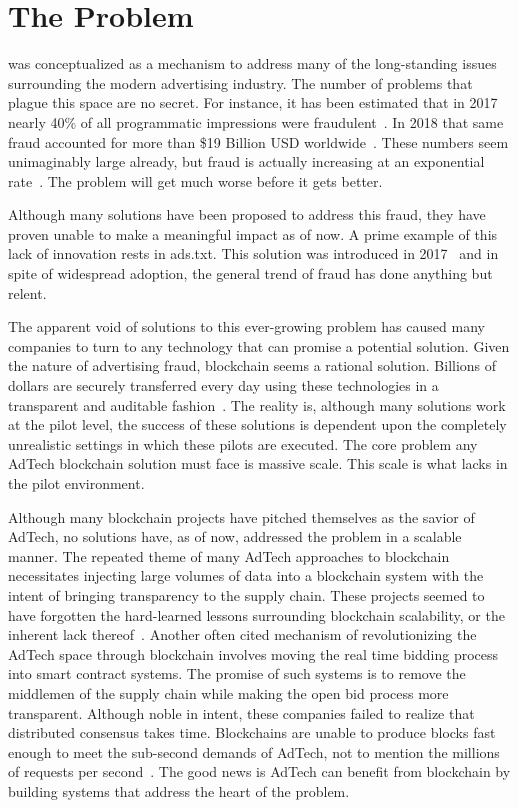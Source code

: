 \section{The Problem}
\LayerTwoLong{} was conceptualized as a mechanism to address many of the
long-standing issues surrounding the modern advertising industry.
The number of problems that plague this space are no secret.
For instance, it has been estimated that in 2017 nearly 40\%  of all
programmatic impressions were fraudulent~\cite{DigitalAdFraud2018}.
In 2018 that same fraud accounted for more than \$19 Billion USD
worldwide~\cite{DigitalAdFraud2018}.
These numbers seem unimaginably large already, but fraud is actually
increasing at an exponential rate~\cite{DigitalAdFraud2018}.
The problem will get much worse before it gets better.

Although many solutions have been proposed to address this fraud, they
have proven unable to make a meaningful impact as of now.
A prime example of this lack of innovation rests in ads.txt.
This solution was introduced in 2017~\cite{IABAdsTxt}
and in spite of widespread adoption, the general trend of
fraud has done anything but relent.

The apparent void of solutions to this ever-growing problem has caused
many companies to turn to any technology that can promise a potential solution.
Given the nature of advertising fraud, blockchain seems a rational solution.
Billions of dollars are securely transferred every day using these
technologies in a transparent and auditable fashion~\cite{EthDVT}.
The reality is, although many solutions work at the pilot level, the
success of these solutions is dependent upon the completely unrealistic
settings in which these pilots are executed.
The core problem any AdTech blockchain solution must face is massive scale.
This scale is what lacks in the pilot environment.

Although many blockchain projects have pitched themselves as the savior
of AdTech, no solutions have, as of now, addressed the problem in a
scalable manner.
The repeated theme of many AdTech approaches to blockchain necessitates
injecting large volumes of data into a blockchain system with the
intent of bringing transparency to the supply chain.
These projects seemed to have forgotten the hard-learned lessons
surrounding blockchain scalability, or the inherent
lack thereof~\cite{BlockchainScaling}.
Another often cited mechanism of revolutionizing the AdTech space
through blockchain involves moving the real time bidding process into
smart contract systems.
The promise of such systems is to remove the middlemen of the supply
chain while making the open bid process more transparent.
Although noble in intent, these companies failed to realize that
distributed consensus takes time.
Blockchains are unable to produce blocks fast enough to meet the
sub-second demands of AdTech, not to mention the millions of requests
per second~\cite{BlockchainTPS}.
The good news is AdTech can benefit from blockchain by building systems
that address the heart of the problem.

